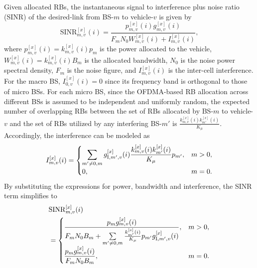 \documentclass[conference, a4paper]{IEEEtran}
\theoremstyle{remark}
\begin{document}
Given allocated RBs, the instantaneous signal to interference plus noise ratio (SINR) of the desired-link from BS-$m$ to vehicle-$v$ is given by
\begin{equation}
    \mathrm{SINR}_{m,v}^{[x]}(i) = \frac{p_{m,v}^{[x]}(i) g_{m,v}^{[x]}(i)}{F_{ m}N_0 W_{m,v}^{[x]}(i) + I_{m,v}^{[x]}(i) },
    \label{eq:SINR}
\end{equation}
where $p_{m,v}^{[x]}(i) = k_{m,v}^{[x]}(i) p_m$ is the power allocated to the vehicle, $W_{m,v}^{[x]}(i) = k_{m,v}^{[x]}(i) B_m$ is the allocated bandwidth, $N_0$ is the noise power spectral density, $F_{m}$ is the noise figure, and $I_{m,v}^{[x]}(i)$ is the inter-cell interference. For the macro BS, $I_{0,v}^{[x]}(i)=0$ since its frequency band is orthogonal to those of micro BSs. 
For each micro BS, since the OFDMA-based RB allocation across different BSs is assumed to be independent and uniformly random, the expected number of overlapping RBs between the set of RBs allocated by BS-$m$ to vehicle-$v$ and the set of RBs utilized by any interfering BS-$m'$ is $\frac{k_{m,v}^{[x]}(i) k_{m'}^{[x]}(i)}{K_\mu}$. 
Accordingly, the interference can be modeled as
\begin{equation}
    \begin{aligned}
        I_{m,v}^{[x]}(i) = 
        \begin{cases}
            \displaystyle
            \sum\limits_{m'\neq 0,m} g_{{\rm I},m',v}^{[x]}(i) \frac{k_{m,v}^{[x]}(i) k_{m'}^{[x]}(i)}{K_\mu}  p_{m'}, &  m>0, \\
            \displaystyle
            0, & m=0.
        \end{cases}
    \end{aligned}
    \label{eq:interference}
\end{equation}
By substituting the expressions for power, bandwidth and interference, the SINR term simplifies to 
\begin{equation}
    \begin{aligned}
        & \mathrm{SINR}_{m,v}^{[x]}(i) \\
        & = 
        \begin{cases}
            \displaystyle
            \frac{ p_m g_{m,v}^{[x]}(i)}
            {F_m N_0 B_m 
             + \sum\limits_{m'\neq 0,m} 
               \frac{k_{m'}^{[x]}(i)}{K_\mu}  p_{m'} g_{{\rm I},m',v}^{[x]}(i)}, 
            & m>0, \\[2ex]
            \displaystyle
            \frac{ p_m g_{m,v}^{[x]}(i)}{F_m N_0 B_m}, 
            & m=0.
        \end{cases}
    \end{aligned}
    \label{eq:SINR simplified}
\end{equation}
\end{document}

